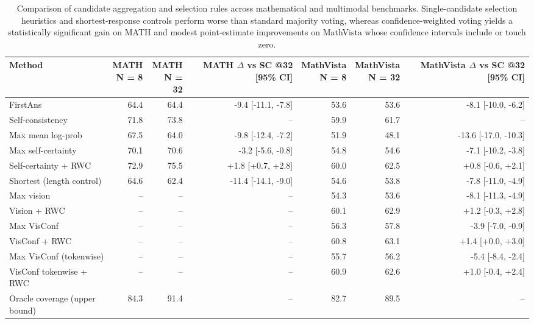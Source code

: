 \begin{table}[t]
\centering
\small
\caption{Comparison of candidate aggregation and selection rules across mathematical and multimodal benchmarks. Single-candidate selection heuristics and shortest-response controls perform worse than standard majority voting, whereas confidence-weighted voting yields a statistically significant gain on MATH and modest point-estimate improvements on MathVista whose confidence intervals include or touch zero.}
\label{tab:t3-methods}
\begin{tabular}{lrrrrrr}
\toprule
Method & \makecell{MATH\\N = 8} & \makecell{MATH\\N = 32} & \makecell{MATH $\Delta$ vs SC\\@32 [95\% CI]} & \makecell{MathVista\\N = 8} & \makecell{MathVista\\N = 32} & \makecell{MathVista $\Delta$ vs SC\\@32 [95\% CI]} \\
\midrule
FirstAns & 64.4 & 64.4 & -9.4 [-11.1, -7.8] & 53.6 & 53.6 & -8.1 [-10.0, -6.2] \\
Self-consistency & 71.8 & 73.8 & – & 59.9 & 61.7 & – \\
Max mean log-prob & 67.5 & 64.0 & -9.8 [-12.4, -7.2] & 51.9 & 48.1 & -13.6 [-17.0, -10.3] \\
Max self-certainty & 70.1 & 70.6 & -3.2 [-5.6, -0.8] & 54.8 & 54.6 & -7.1 [-10.2, -3.8] \\
Self-certainty + RWC & 72.9 & 75.5 & +1.8 [+0.7, +2.8] & 60.0 & 62.5 & +0.8 [-0.6, +2.1] \\
Shortest (length control) & 64.6 & 62.4 & -11.4 [-14.1, -9.0] & 54.6 & 53.8 & -7.8 [-11.0, -4.9] \\
Max vision & – & – & – & 54.3 & 53.6 & -8.1 [-11.3, -4.9] \\
Vision + RWC & – & – & – & 60.1 & 62.9 & +1.2 [-0.3, +2.8] \\
Max VisConf & – & – & – & 56.3 & 57.8 & -3.9 [-7.0, -0.9] \\
VisConf + RWC & – & – & – & 60.8 & 63.1 & +1.4 [+0.0, +3.0] \\
Max VisConf (tokenwise) & – & – & – & 55.7 & 56.2 & -5.4 [-8.4, -2.4] \\
VisConf tokenwise + RWC & – & – & – & 60.9 & 62.6 & +1.0 [-0.4, +2.4] \\
Oracle coverage (upper bound) & 84.3 & 91.4 & – & 82.7 & 89.5 & – \\
\bottomrule
\end{tabular}
\end{table}
